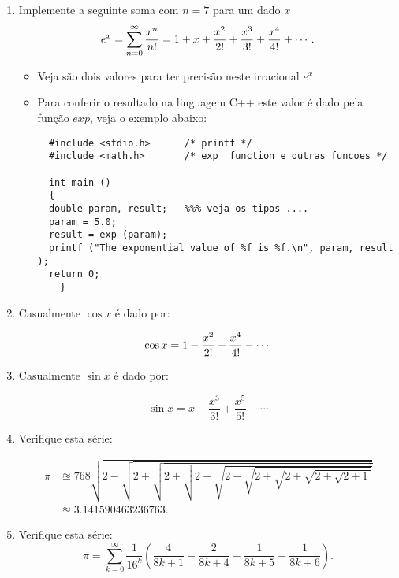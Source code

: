\documentclass[12pt,a4paper]{article}
\begin{document}
\begin{enumerate}

  \item Implemente a seguinte soma com  $n=7$ para um dado $x$
  $$e^x = \sum^\infty_{n=0} {x^n\over n!} =1 + x + {x^2 \over 2!} + {x^3 \over 3!} + {x^4 \over 4!}+\cdots.$$
  \begin{itemize}
    \item Veja são dois valores para ter precisão neste irracional $e^x$
    \item Para conferir o resultado na linguagem C++ este valor é dado pela função $exp$, veja o 
    exemplo abaixo:
       
\begin{verbatim}
  #include <stdio.h>      /* printf */
  #include <math.h>       /* exp  function e outras funcoes */

  int main ()
  {
  double param, result;   %%% veja os tipos ....
  param = 5.0;
  result = exp (param);
  printf ("The exponential value of %f is %f.\n", param, result );
  return 0;
    }
\end{verbatim}
    
      \end{itemize}


\item Casualmente $\cos x$ é dado por:

$$\cos x = 1 - {x^2 \over 2!} + {x^4 \over 4!} - \cdots$$

\item Casualmente $\sin x$ é dado por:

$$\sin x =  x - \frac{x^3}{3!} + \frac{x^5}{5!} - \cdots $$


\item Verifique esta série:

\begin{align}
\pi &\approxeq 768 \sqrt{2 - \sqrt{2 + \sqrt{2 + \sqrt{2 + \sqrt{2 + \sqrt{2 + \sqrt{2 + \sqrt{2 + \sqrt{2+1}}}}}}}}}\\
&\approxeq 3.141590463236763.
\end{align}


\item Verifique esta série:
$$\pi = \sum_{k = 0}^\infty \frac{1}{16^k}
\left( \frac{4}{8k + 1} - \frac{2}{8k + 4} - \frac{1}{8k + 5} - \frac{1}{8k + 6}\right).$$




\end{enumerate}
\end{document}
